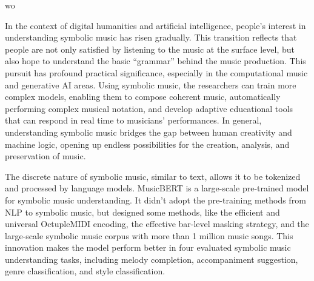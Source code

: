 wo\documentclass[sigconf]{acmart}
\begin{document}
In the context of digital humanities and artificial intelligence, people's interest in understanding symbolic music has risen gradually. This transition reflects that people are not only satisfied by listening to the music at the surface level, but also hope to understand the basic ``grammar'' behind the music production. This pursuit has profound practical significance, especially in the computational music and generative AI areas. Using symbolic music, the researchers can train more complex models, enabling them to compose coherent music, automatically performing complex musical notation, and develop adaptive educational tools that can respond in real time to musicians' performances. In general, understanding symbolic music bridges the gap between human creativity and machine logic, opening up endless possibilities for the creation, analysis, and preservation of music.

The discrete nature of symbolic music, similar to text, allows it to be tokenized and processed by language models. MusicBERT \citep{zengMusicBERTSymbolicMusic2021} is a large-scale pre-trained model for symbolic music understanding. It didn't adopt the pre-training methods from NLP to symbolic music, but designed some methods, like the efficient and universal OctupleMIDI encoding, the effective bar-level masking strategy, and the large-scale symbolic music corpus with more than 1 million music songs. This innovation makes the model perform better in four evaluated symbolic music understanding tasks, including melody completion, accompaniment suggestion, genre classification, and style classification. 
\end{document}
